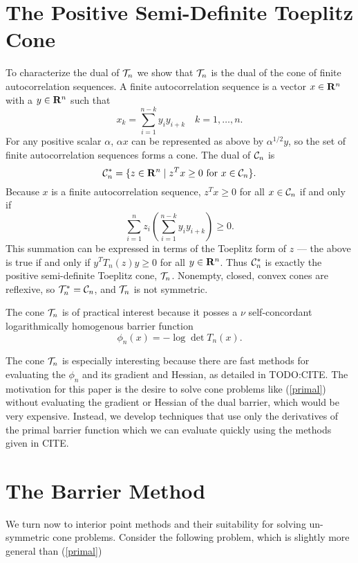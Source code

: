 \documentclass{article}
\begin{document}
\section{The Positive Semi-Definite Toeplitz Cone}

To characterize the dual of $\mathcal{T}_n$ we show that $\mathcal{T}_n$ is the dual of the 
cone of finite autocorrelation sequences. A finite autocorrelation sequence is a vector
$x \in \mathbf{R}^n$ with a $y \in \mathbf{R}^n$ such that 
\[
  x_k = \sum_{i=1}^{n-k} y_iy_{i+k} \quad k=1,\ldots,n.
\] 
For any positive scalar $\alpha$, $\alpha x$ can be represented as above 
by $\alpha^{1/2}y$, so the set of finite autocorrelation sequences forms a cone.
The dual of $\mathcal{C}_n$ is 
\[
  \mathcal{C}^*_n = \{z \in \mathbf{R}^n \mid z^Tx \geq 0 \text{ for } x \in \mathcal{C}_n\}.
\]
Because $x$ is a finite autocorrelation sequence, $z^Tx \geq 0$ for all $x \in \mathcal{C}_n$
if and only if
\[
  \sum_{i=1}^n z_i \left(\sum_{i=1}^{n-k} y_iy_{i+k}\right) \geq 0.
\]
This summation can be expressed in terms of the Toeplitz form of $z$ ---
the above is true if and only if $y^TT_n(z)y \geq 0$ for all $y \in \mathbf{R}^n$. Thus
$\mathcal{C}^*_n$ is exactly the positive semi-definite Toeplitz cone, $\mathcal{T}_n$. Nonempty,
closed, convex cones are reflexive, so $\mathcal{T}_n^* = \mathcal{C}_n$, and $\mathcal{T}_n$ is not
symmetric.

The cone $\mathcal{T}_n$ is of practical interest because it posses a 
$\nu$ self-concordant logarithmically homogenous barrier function
\[
\phi_n(x) = - \log \det T_n(x).
\]

The cone $\mathcal{T}_n$ is especially interesting because there are fast methods for evaluating
the $\phi_n$ and its gradient and Hessian, as detailed in TODO:CITE. The motivation for this
paper is the desire to solve cone problems like (\ref{primal}) without evaluating the
gradient or Hessian of the dual barrier, which would be very expensive. Instead, we develop
techniques that use only the derivatives of the primal barrier function which we can evaluate
quickly using the methods given in CITE.

\section{The Barrier Method}

We turn now to interior point methods and their suitability for
solving un-symmetric cone problems. Consider the following problem, which is slightly 
more general than (\ref{primal})
\end{document}
